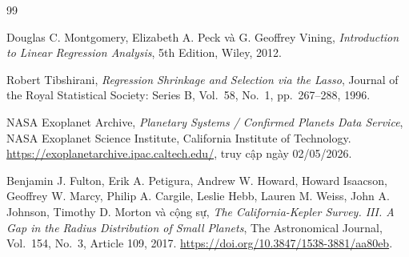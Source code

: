 \newpage
\begin{thebibliography}{99}

    Douglas C. Montgomery, Elizabeth A. Peck và G. Geoffrey Vining,
    \textit{Introduction to Linear Regression Analysis},
    5th Edition, Wiley, 2012.

    Robert Tibshirani,
    \textit{Regression Shrinkage and Selection via the Lasso},
    Journal of the Royal Statistical Society: Series B, Vol.~58, No.~1,
    pp.~267--288, 1996.

    NASA Exoplanet Archive,
    \textit{Planetary Systems / Confirmed Planets Data Service},
    NASA Exoplanet Science Institute, California Institute of Technology.
    \url{https://exoplanetarchive.ipac.caltech.edu/},
    truy cập ngày 02/05/2026.

    Benjamin J. Fulton, Erik A. Petigura, Andrew W. Howard, Howard Isaacson,
    Geoffrey W. Marcy, Philip A. Cargile, Leslie Hebb, Lauren M. Weiss,
    John A. Johnson, Timothy D. Morton và cộng sự,
    \textit{The California-Kepler Survey. III. A Gap in the Radius Distribution of Small Planets},
    The Astronomical Journal, Vol.~154, No.~3, Article 109, 2017.
    \url{https://doi.org/10.3847/1538-3881/aa80eb}.

\end{thebibliography}
